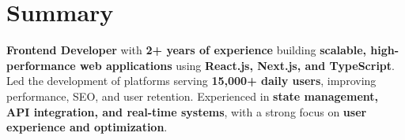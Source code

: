 \documentclass[a4paper,11pt]{article}
\begin{document}
\section{\textbf{Summary}}
\vspace{1mm}
\small{



\textbf{Frontend Developer} with \textbf{2+ years of experience} building \textbf{scalable, high-performance web applications} using \textbf{React.js, Next.js, and TypeScript}. Led the development of platforms serving \textbf{15,000+ daily users}, improving performance, SEO, and user retention. Experienced in \textbf{state management, API integration, and real-time systems}, with a strong focus on \textbf{user experience and optimization}.







}
\vspace{-2mm}
\end{document}
